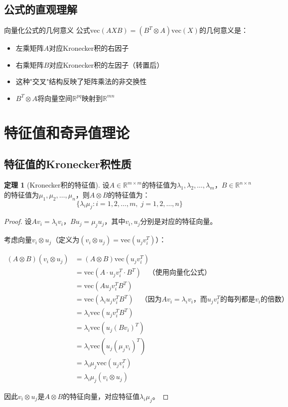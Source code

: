 \documentclass[11pt,a4paper]{ctexart}
\theoremstyle{definition}
\newtheorem{theorem}{定理}[section]
\newcommand{\RR}{\mathbb{R}}
\newcommand{\vect}{\text{vec}}
\begin{document}
\subsection{公式的直观理解}

\begin{insight}{向量化公式的几何意义}
公式$\vect(AXB) = (B^T \otimes A) \vect(X)$的几何意义是：
\begin{itemize}
\item 左乘矩阵$A$对应Kronecker积的右因子
\item 右乘矩阵$B$对应Kronecker积的左因子（转置后）
\item 这种"交叉"结构反映了矩阵乘法的非交换性
\item $B^T \otimes A$将向量空间$\RR^{pq}$映射到$\RR^{mn}$
\end{itemize}
\end{insight}

\section{特征值和奇异值理论}

\subsection{特征值的Kronecker积性质}

\begin{theorem}[Kronecker积的特征值]
设$A \in \RR^{m \times m}$的特征值为$\lambda_1, \lambda_2, \ldots, \lambda_m$，$B \in \RR^{n \times n}$的特征值为$\mu_1, \mu_2, \ldots, \mu_n$，则$A \otimes B$的特征值为：
$$\{\lambda_i \mu_j : i = 1, 2, \ldots, m, \; j = 1, 2, \ldots, n\}$$
\end{theorem}

\begin{proof}
设$Av_i = \lambda_i v_i$，$Bu_j = \mu_j u_j$，其中$v_i, u_j$分别是对应的特征向量。

考虑向量$v_i \otimes u_j$（定义为$(v_i \otimes u_j) = \vect(u_j v_i^T)$）：

\begin{align}
(A \otimes B)(v_i \otimes u_j) &= (A \otimes B) \vect(u_j v_i^T) \\
&= \vect(A \cdot u_j v_i^T \cdot B^T) \quad \text{（使用向量化公式）} \\
&= \vect(A u_j v_i^T B^T) \\
&= \vect(\lambda_i u_j v_i^T B^T) \quad \text{（因为$A v_i = \lambda_i v_i$，而$u_j v_i^T$的每列都是$v_i$的倍数）} \\
&= \lambda_i \vect(u_j v_i^T B^T) \\
&= \lambda_i \vect(u_j (B v_i)^T) \\
&= \lambda_i \vect(u_j (\mu_j v_i)^T) \\
&= \lambda_i \mu_j \vect(u_j v_i^T) \\
&= \lambda_i \mu_j (v_i \otimes u_j)
\end{align}

因此$v_i \otimes u_j$是$A \otimes B$的特征向量，对应特征值$\lambda_i \mu_j$。
\end{proof}
\end{document}
